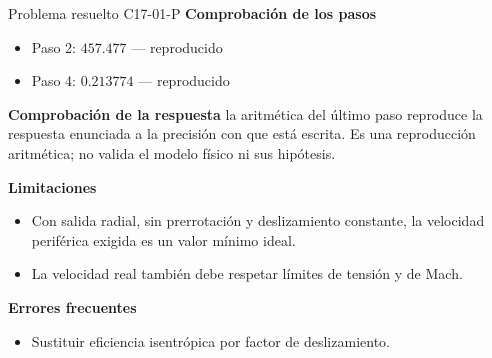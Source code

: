 \documentclass[10pt,openany]{book}
\begin{document}
\begin{studiumworked}{Problema resuelto C17-01-P}
\noindent\textbf{Comprobación de los pasos}
\begin{itemize}
\item Paso 2: $457.477$ — reproducido
\item Paso 4: $0.213774$ — reproducido
\end{itemize}

\noindent\textbf{Comprobación de la respuesta} la aritmética del último paso reproduce la respuesta enunciada a la precisión con que está escrita. Es una reproducción aritmética; no valida el modelo físico ni sus hipótesis.

\noindent\textbf{Limitaciones}
\begin{itemize}
\item Con salida radial, sin prerrotación y deslizamiento constante, la velocidad periférica exigida es un valor mínimo ideal.
\item La velocidad real también debe respetar límites de tensión y de Mach.
\end{itemize}

\noindent\textbf{Errores frecuentes}
\begin{itemize}
\item Sustituir eficiencia isentrópica por factor de deslizamiento.
\end{itemize}
\end{studiumworked}
\end{document}
